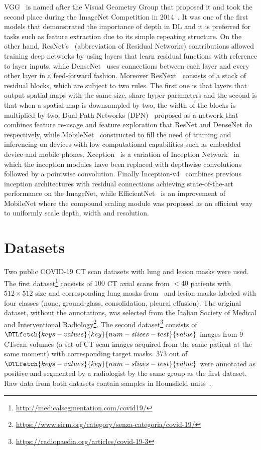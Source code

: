 \documentclass{elsarticle}
\begin{document}
VGG~\cite{simonyan2014very} is named after the Visual Geometry Group that proposed it and took the second place during the ImageNet Competition in 2014~\cite{deng2009imagenet}.
It was one of the first models that demonstrated the importance of depth in DL and it is preferred for tasks such as feature extraction due to its simple repeating structure.
On the other hand, ResNet's~\cite{he2016deep} (abbreviation of Residual Networks) contributions allowed training deep networks by using layers that learn residual functions with reference to layer inputs, while DenseNet~\cite{huang2017densely} uses connections between each layer and every other layer in a feed-forward fashion.
Moreover ResNext~\cite{xie2017aggregated} consists of a stack of residual blocks, which are subject to two rules.
The first one is that layers that output spatial maps with the same size, share hyper-parameters and the second is that when a spatial map is downsampled by two, the width of the blocks is multiplied by two.
Dual Path Networks (DPN)~\cite{chen2017dual} proposed as a network that combines feature re-usage and feature exploration that ResNet and DenseNet do respectively, while MobileNet~\cite{howard2017mobilenets} constructed to fill the need of training and inferencing on devices with low computational capabilities such as embedded device and mobile phones.
Xception~\cite{chollet2017xception} is a variation of Inception Network~\cite{szegedy2015going} in which the inception modules have been replaced with depthwise convolutions followed by a pointwise convolution.
Finally Inception-v4~\cite{szegedy2017inception} combines previous inception architectures with residual connections achieving state-of-the-art performance on the ImageNet, while EfficientNet~\cite{tan2019efficientnet} is an improvement of MobileNet where the compound scaling module was proposed as an efficient way to uniformly scale depth, width and resolution.

\section{Datasets}\label{sec:datasets}
Two public COVID-19 CT scan datasets with lung and lesion masks were used.
The first dataset\footnote{\url{http://medicalsegmentation.com/covid19/}} consists of $100$ CT axial scans from $<40$ patients with $512\times 512$ size and corresponding lung masks from~\cite{hofmanninger2020automatic} and lesion masks labeled with four classes (none, ground-glass, consolidation, pleural effusion).
The original dataset, without the annotations, was selected from the Italian Society of Medical and Interventional Radiology\footnote{\url{https://www.sirm.org/category/senza-categoria/covid-19/}}.
The second dataset\footnote{\url{https://radiopaedia.org/articles/covid-19-3}} consists of $\DTLfetch{keys-values}{key}{num-slices-test}{value}$ images from $9$ CT\@ scan volumes (a set of CT scan images acquired from the same patient at the same moment) with corresponding target masks.
373 out of $\DTLfetch{keys-values}{key}{num-slices-test}{value}$ were annotated as positive and segmented by a radiologist by the same group as the first dataset.
Raw data from both datasets contain samples in Hounsfield units~\cite{schneider1996calibration}.
\end{document}
